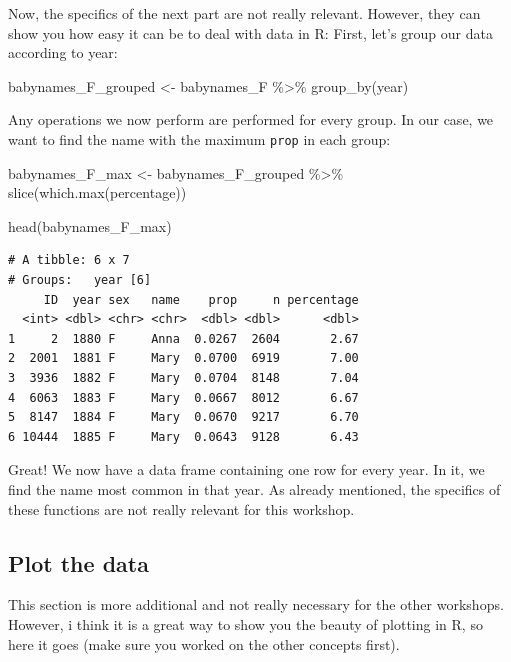 \documentclass[
  letterpaper,
  DIV=11,
  numbers=noendperiod]{scrartcl}
\newenvironment{Shaded}{\begin{snugshade}}{\end{snugshade}}
\newcommand{\FunctionTok}[1]{\textcolor[rgb]{0.28,0.35,0.67}{#1}}
\newcommand{\NormalTok}[1]{\textcolor[rgb]{0.00,0.23,0.31}{#1}}
\newcommand{\OtherTok}[1]{\textcolor[rgb]{0.00,0.23,0.31}{#1}}
\newcommand{\SpecialCharTok}[1]{\textcolor[rgb]{0.37,0.37,0.37}{#1}}
\begin{document}
Now, the specifics of the next part are not really relevant. However,
they can show you how easy it can be to deal with data in R: First,
let's group our data according to year:

\begin{Shaded}
\begin{Highlighting}[]
\NormalTok{babynames\_F\_grouped }\OtherTok{\textless{}{-}}\NormalTok{ babynames\_F }\SpecialCharTok{\%\textgreater{}\%}
  \FunctionTok{group\_by}\NormalTok{(year)}
\end{Highlighting}
\end{Shaded}

Any operations we now perform are performed for every group. In our
case, we want to find the name with the maximum \texttt{prop} in each
group:

\begin{Shaded}
\begin{Highlighting}[]
\NormalTok{babynames\_F\_max }\OtherTok{\textless{}{-}}\NormalTok{ babynames\_F\_grouped }\SpecialCharTok{\%\textgreater{}\%}
  \FunctionTok{slice}\NormalTok{(}\FunctionTok{which.max}\NormalTok{(percentage))}

\FunctionTok{head}\NormalTok{(babynames\_F\_max)}
\end{Highlighting}
\end{Shaded}

\begin{verbatim}
# A tibble: 6 x 7
# Groups:   year [6]
     ID  year sex   name    prop     n percentage
  <int> <dbl> <chr> <chr>  <dbl> <dbl>      <dbl>
1     2  1880 F     Anna  0.0267  2604       2.67
2  2001  1881 F     Mary  0.0700  6919       7.00
3  3936  1882 F     Mary  0.0704  8148       7.04
4  6063  1883 F     Mary  0.0667  8012       6.67
5  8147  1884 F     Mary  0.0670  9217       6.70
6 10444  1885 F     Mary  0.0643  9128       6.43
\end{verbatim}

Great! We now have a data frame containing one row for every year. In
it, we find the name most common in that year. As already mentioned, the
specifics of these functions are not really relevant for this workshop.

\hypertarget{plot-the-data}{%
\subsection{Plot the data}\label{plot-the-data}}

This section is more additional and not really necessary for the other
workshops. However, i think it is a great way to show you the beauty of
plotting in R, so here it goes (make sure you worked on the other
concepts first).
\end{document}
